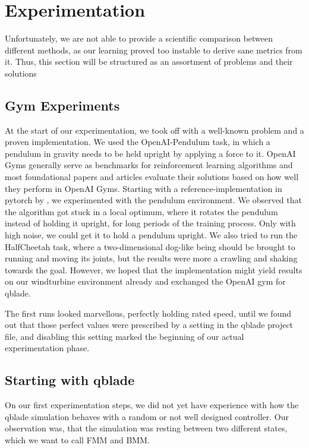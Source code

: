 \documentclass[hyperref,german,beleg]{cgvpub}
\begin{document}
\chapter{Experimentation}

Unfortunately, we are not able to provide a scientific comparison between different methods, as our learning proved too instable to derive sane metrics from it. Thus, this section will be structured as an assortment of problems and their solutions

\section{Gym Experiments}

At the start of our experimentation, we took off with a well-known problem and a proven implementation. We used the OpenAI-Pendulum task, in which a pendulum in gravity needs to be held upright by applying a force to it. OpenAI Gyms generally serve as benchmarks for reinforcement learning algorithms and most foundational papers and articles evaluate their solutions based on how well they perform in OpenAI Gyms. Starting with a reference-implementation in pytorch by \cite{DeepDeterministicPolicy}, we experimented with the pendulum environment. We observed that the algorithm got stuck in a local optimum, where it rotates the pendulum instead of holding it upright, for long periods of the training process. Only with high noise, we could get it to hold a pendulum upright. We also tried to run the HalfCheetah task, where a two-dimensional dog-like being should be brought to running and moving its joints, but the results were more a crawling and shaking towards the goal. However, we hoped that the implementation might yield results on our windturbine environment already and exchanged the OpenAI gym for qblade.

The first runs looked marvellous, perfectly holding rated speed, until we found out that those perfect values were prescribed by a setting in the qblade project file, and disabling this setting marked the beginning of our actual experimentation phase.

\section{Starting with qblade}

On our first experimentation steps, we did not yet have experience with how the qblade simulation behaves with a random or not well designed controller. Our observation was, that the simulation was resting between two different states, which we want to call \ac{FMM} and \ac{BMM}.
\end{document}
